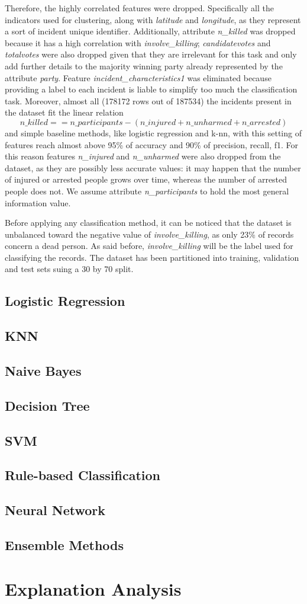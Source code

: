\documentclass[10pt,a4paper]{report}
\begin{document}
Therefore, the highly correlated features were dropped.
Specifically all the indicators used for clustering, along with \textit{latitude} and \textit{longitude}, as they represent a sort of incident unique identifier.
Additionally, attribute \textit{n\_killed} was dropped because it has a high correlation with \textit{involve\_killing}; \textit{candidatevotes} and \textit{totalvotes} were also dropped given that they are irrelevant for this task and only add further details to the majority winning party already represented by the attribute \textit{party}.
Feature \textit{incident\_characteristics1} was eliminated because providing a label to each incident is liable to simplify too much the classification task.
Moreover, almost all (178172 rows out of 187534) the incidents present in the dataset fit the linear relation
$$ n\_killed == n\_participants - (n\_injured + n\_unharmed + n\_arrested) $$
and simple baseline methods, like logistic regression and k-nn, with this setting of features reach almost above 95\% of accuracy and 90\% of precision, recall, f1.
For this reason features \textit{n\_injured} and \textit{n\_unharmed} were also dropped from the dataset, as they are possibly less accurate values: it may happen that the number of injured or arrested people grows over time, whereas the number of arrested people does not.
We assume attribute \textit{n\_participants} to hold the most general information value.

Before applying any classification method, it can be noticed that the dataset is unbalanced toward the negative value of \textit{involve\_killing}, as only 23\% of records concern a dead person.
As said before, \textit{involve\_killing} will be the label used for classifying the records.
The dataset has been partitioned into training, validation and test sets suing a 30 by 70 split.

\section{Logistic Regression}
\section{KNN}
\section{Naive Bayes}
\section{Decision Tree}
\section{SVM}
\section{Rule-based Classification}
\section{Neural Network}
\section{Ensemble Methods}

\chapter{Explanation Analysis}
\end{document}
